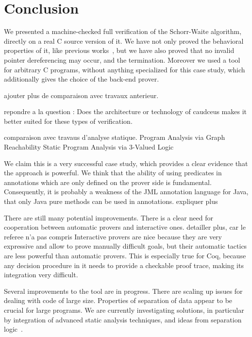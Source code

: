 \section{Conclusion}
\label{sec:conclusion}

We presented a machine-checked full verification of the Schorr-Waite
algorithm, directly on a real C source version of it. We have not only
proved the behavioral properties of it, like previous
works~\cite{bornat00mpc,mehta03cade}, but we have also proved that no
invalid pointer dereferencing may occur, and the
termination. Moreover we used a tool for arbitrary C programs, without
anything specialized for this case study, which additionally gives the
choice of the back-end prover.
{\Huge ajouter plus de comparaison avec travaux anterieur. 

repondre a la question : Does the architecture or technology of
caudceus makes it better suited for these types of verification.

comparaison
  avec travaus d'analyse statique. \cite{sagiv02toplas,reps03esop} Program Analysis via Graph Reachability
Static Program Analysis via 3-Valued Logic
}

We claim this is a very successful case study, which provides a clear
evidence that the \caduceus{} approach is powerful. We think that the
ability of using predicates in annotations which are only defined on
the prover side is fundamental. Consequently, it is probably a
weakness of the JML annotation language for Java, that only Java
pure methods can be used in annotations. {\Huge expliquer plus }

There are still many potential improvements. There is a clear
need for cooperation between automatic provers and interactive
ones. {\Huge detailler plus, car le referee n'a pas compris}
Interactive provers are nice because they are very expressive and
allow to prove manually difficult goals, but their automatic tactics
are less powerful than automatic provers. This is especially true for
Coq, because any decision procedure in it needs to provide a checkable
proof trace, making its integration very difficult.

Several improvements to the \caduceus{} tool are in progress. There are
scaling up issues for dealing with code of large size. Properties of
separation of data appear to be crucial for large programs. We are
currently investigating solutions, in particular by integration of
advanced static analysis techniques, and ideas from separation
logic~\cite{reynolds02lics}.

